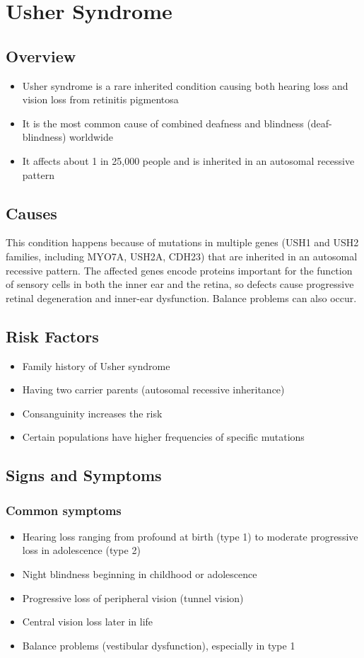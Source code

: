\chapter{Usher Syndrome}
\label{sec:Usher Syndrome}

\section{Overview}
\begin{itemize}[noitemsep]
  \item Usher syndrome is a rare inherited condition causing both hearing loss and vision loss from retinitis pigmentosa
  \item It is the most common cause of combined deafness and blindness (deaf-blindness) worldwide
  \item It affects about 1 in 25,000 people and is inherited in an autosomal recessive pattern
\end{itemize}
\section{Causes}
This condition happens because of mutations in multiple genes (USH1 and USH2 families, including MYO7A, USH2A, CDH23) that are inherited in an autosomal recessive pattern. The affected genes encode proteins important for the function of sensory cells in both the inner ear and the retina, so defects cause progressive retinal degeneration and inner-ear dysfunction. Balance problems can also occur.
\section{Risk Factors}
\begin{itemize}[noitemsep]
  \item Family history of Usher syndrome
  \item Having two carrier parents (autosomal recessive inheritance)
  \item Consanguinity increases the risk
  \item Certain populations have higher frequencies of specific mutations
\end{itemize}
\section{Signs and Symptoms}
\subsection{Common symptoms}
\begin{itemize}[noitemsep]
  \item Hearing loss ranging from profound at birth (type 1) to moderate progressive loss in adolescence (type 2)
  \item Night blindness beginning in childhood or adolescence
  \item Progressive loss of peripheral vision (tunnel vision)
  \item Central vision loss later in life
  \item Balance problems (vestibular dysfunction), especially in type 1
\end{itemize}
